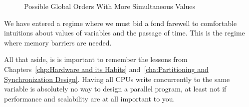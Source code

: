 \begin{figure}[htb]
\begin{center}
\end{center}
\caption{Possible Global Orders With More Simultaneous Values}
\label{fig:advsync:Possible Global Orders With More Simultaneous Values}
\end{figure}

We have entered a regime where we must bid a fond farewell to
comfortable intuitions about values of variables and the passage of time.
This is the regime where memory barriers are needed.

All that aside, is is important to remember the lessons from
Chapters~\ref{chp:Hardware and its Habits}
and~\ref{cha:Partitioning and Synchronization Design}.
Having all CPUs write concurrently to the same variable
is absolutely no way to design a parallel program, at least
not if performance and scalability are at all important to you.


